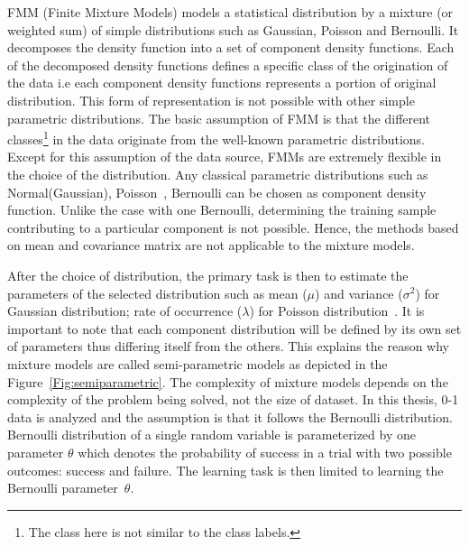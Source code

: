 FMM (Finite Mixture Models) models a statistical distribution by a mixture (or weighted sum) of simple distributions such as Gaussian, Poisson and Bernoulli. It decomposes the density function into a set of component density functions. Each of the decomposed density functions defines a specific class of the origination of the data i.e each component density functions represents a portion of original distribution. This form of representation is not possible with other simple parametric distributions. The basic assumption of FMM is that the different classes\footnote{The class here is not similar to the class labels.} in the data originate from the well-known parametric distributions. Except for this assumption of the data source, FMMs are extremely flexible in the choice of the distribution. Any classical parametric distributions such as Normal(Gaussian), Poisson~\cite{poission}, Bernoulli can be chosen as component density function. Unlike the case with one Bernoulli, determining the training sample contributing to a particular component is not possible. Hence, the methods based on mean and covariance matrix are not applicable to the mixture models. 

After the choice of distribution, the primary task is then to estimate the parameters of the selected distribution such as mean ($\mu$) and variance ($\sigma ^2 $) for Gaussian distribution; rate of occurrence ($\lambda $) for Poisson distribution~\cite{poission}. It is important to note that each component distribution will be defined by its own set of parameters thus differing itself from the others. This explains the reason why mixture models are called semi-parametric models as depicted in the Figure~\ref{Fig:semiparametric}. The complexity of mixture models depends on the complexity of the problem being solved, not the size of dataset.  In this thesis, 0-1 data is analyzed and the assumption is that it follows the Bernoulli distribution. Bernoulli distribution of a single random variable is parameterized by one parameter $\theta$ which denotes the probability of success in a trial with two possible outcomes: success and failure. The learning task is then limited to learning the Bernoulli parameter~$\theta$.





